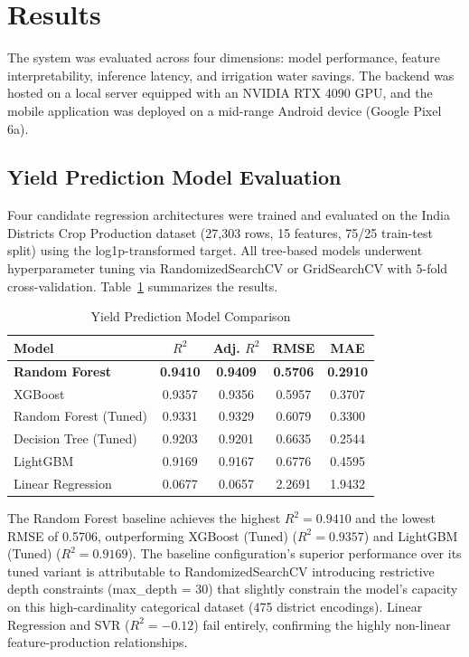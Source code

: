 \documentclass[conference]{IEEEtran}
\begin{document}
\section{Results}

The system was evaluated across four dimensions: model performance, feature interpretability, inference latency, and irrigation water savings. The backend was hosted on a local server equipped with an NVIDIA RTX 4090 GPU, and the mobile application was deployed on a mid-range Android device (Google Pixel 6a).

\subsection{Yield Prediction Model Evaluation}

Four candidate regression architectures were trained and evaluated on the India Districts Crop Production dataset (27,303 rows, 15 features, 75/25 train-test split) using the log1p-transformed target. All tree-based models underwent hyperparameter tuning via RandomizedSearchCV or GridSearchCV with 5-fold cross-validation. Table~\ref{tab:model_comparison} summarizes the results.

\begin{table}[htbp]
\caption{Yield Prediction Model Comparison}
\label{tab:model_comparison}
\centering
\begin{tabular}{lcccc}
\toprule
\textbf{Model} & \textbf{$R^2$} & \textbf{Adj. $R^2$} & \textbf{RMSE} & \textbf{MAE} \\
\midrule
\textbf{Random Forest} & \textbf{0.9410} & \textbf{0.9409} & \textbf{0.5706} & \textbf{0.2910} \\
XGBoost~\cite{b25} & 0.9357 & 0.9356 & 0.5957 & 0.3707 \\
Random Forest (Tuned) & 0.9331 & 0.9329 & 0.6079 & 0.3300 \\
Decision Tree (Tuned) & 0.9203 & 0.9201 & 0.6635 & 0.2544 \\
LightGBM~\cite{b26} & 0.9169 & 0.9167 & 0.6776 & 0.4595 \\
Linear Regression & 0.0677 & 0.0657 & 2.2691 & 1.9432 \\
\bottomrule
\end{tabular}
\end{table}

The Random Forest baseline achieves the highest $R^2 = 0.9410$ and the lowest RMSE of 0.5706, outperforming XGBoost (Tuned) ($R^2 = 0.9357$) and LightGBM (Tuned) ($R^2 = 0.9169$). The baseline configuration's superior performance over its tuned variant is attributable to RandomizedSearchCV introducing restrictive depth constraints (max\_depth = 30) that slightly constrain the model's capacity on this high-cardinality categorical dataset (475 district encodings). Linear Regression and SVR ($R^2 = -0.12$) fail entirely, confirming the highly non-linear feature-production relationships.
\end{document}
